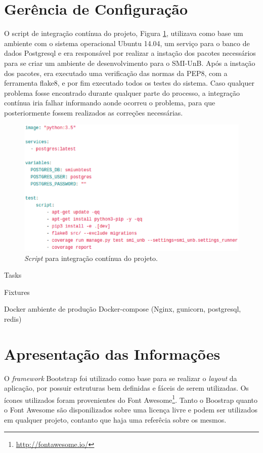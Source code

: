\section{Gerência de Configuração}
O script de integração contínua do projeto, Figura \ref{integracao}, utilizava como base um ambiente com o sistema operacional Ubuntu 14.04, um serviço para o banco de dados Postgresql e era responsável por realizar a instação dos pacotes necessários para se criar um ambiente de desenvolvimento para o SMI-UnB. Após a instação dos pacotes, era executado uma verificação das normas da PEP8, com a ferramenta flake8, e por fim executado todos os testes do sistema. Caso qualquer problema fosse encontrado durante qualquer parte do processo, a integração contínua iria falhar informando aonde ocorreu o problema, para que posteriormente fossem realizados as correções necessárias.

\begin{figure}[!h]
    \centering
    \includegraphics[keepaspectratio=true,scale=0.65]{figuras/integracao.eps}
    \caption{\textit{Script} para integração contínua do projeto.}
    \label{integracao}
\end{figure}

Tasks

Fixtures

Docker
    ambiente de produção
    Docker-compose (Nginx, gunicorn, postgresql, redis)
\section{Apresentação das Informações}
O \textit{framework} Bootstrap foi utilizado como base para se realizar o \textit{layout} da aplicação, por possuir estruturas bem definidas e fáceis de serem utilizadas. Os ícones utilizados foram provenientes do Font Awesome\footnote{\url{http://fontawesome.io/}}. Tanto o Boostrap quanto o Font Awesome são disponilizados sobre uma licença livre e podem ser utilizados em qualquer projeto, contanto que haja uma referêcia sobre os mesmos.

